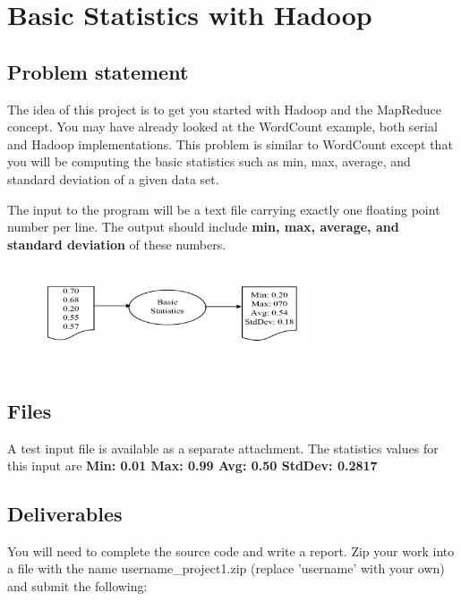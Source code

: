 \section*{Basic Statistics with Hadoop}       

\subsection*{Problem statement}
 
The idea of this project is to get you started with Hadoop and the MapReduce
concept. You may have already looked at the WordCount example, both serial and
Hadoop implementations. This problem is similar to WordCount except that you
will be computing the basic statistics such as min, max, average, and standard
deviation of a given data set.

The input to the program will be a text file carrying exactly one floating
point number per line. The output should include \textbf{min, max, average, and
standard deviation} of these numbers.

\begin{figure}[!htbp]
\includegraphics[width=8cm,height=3cm]{section/icloud/assignment/problems/project1/p1example.png}
\centering
\end{figure}

\subsection*{Files}
A test input file is available as a separate attachment.
The statistics values for this input are \textbf{Min: 0.01 Max: 0.99 Avg: 0.50 StdDev: 0.2817}


\subsection*{Deliverables}

You will need to complete the source code and write a report. Zip your work
into a file with the name username\_project1.zip (replace 'username' with your
own) and submit the following:

